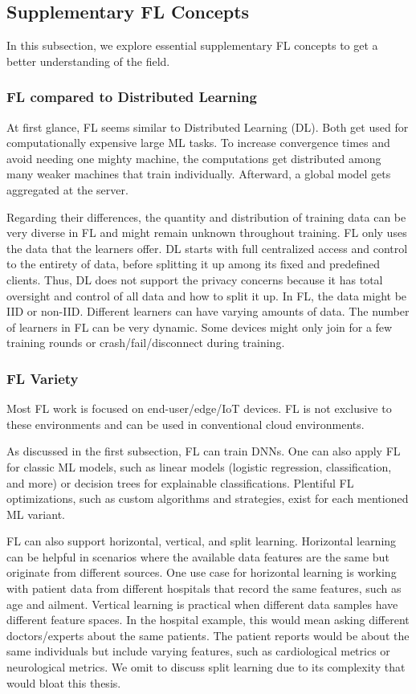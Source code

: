 \subsection{Supplementary FL Concepts}

In this subsection, we explore essential supplementary FL concepts
to get a better understanding of the field.

\subsubsection{FL compared to Distributed Learning}

At first glance, FL seems similar to Distributed Learning (DL).
Both get used for computationally expensive large ML tasks.
To increase convergence times and avoid needing one mighty machine,
the computations get distributed among many weaker machines that train individually.
Afterward, a global model gets aggregated
at the server.

Regarding their differences,
the quantity and distribution of training data can be very diverse in FL
and might remain unknown throughout training.
FL only uses the data that the learners offer. 
DL starts with full centralized access and control to the entirety of data,
before splitting it up among its fixed and predefined clients.
Thus, DL does not support the privacy concerns because it has total
oversight and control of all data and how to split it up.
In FL, the data might be IID or non-IID.
Different learners can have varying amounts of data.
The number of learners in FL can be very dynamic.
Some devices might only join for a few training rounds
or crash/fail/disconnect during training.

\subsubsection{FL Variety}

Most FL work is focused on end-user/edge/IoT devices.
FL is not exclusive to these environments and can be used in
conventional cloud environments.

As discussed in the first subsection, FL can train DNNs.
One can also apply FL for classic ML models, such as
linear models (logistic regression, classification, and more) or
decision trees for explainable classifications.
Plentiful FL optimizations, such as custom algorithms and strategies,
exist for each mentioned ML variant.

FL can also support horizontal, vertical, and split learning.
Horizontal learning can be helpful in scenarios where the available data features are the same but
originate from different sources.
One use case for horizontal learning is working with
patient data from different hospitals that record the same features,
such as age and ailment.
Vertical learning is practical when different data samples have
different feature spaces.
In the hospital example, this would mean asking different doctors/experts
about the same patients. 
The patient reports would be about the same individuals but include varying features,
such as cardiological metrics or neurological metrics.
We omit to discuss split learning due to its complexity that would bloat this thesis.

